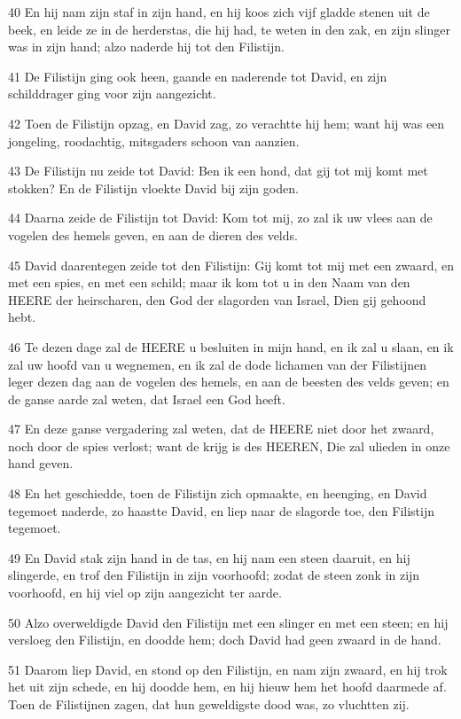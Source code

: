 \par 40 En hij nam zijn staf in zijn hand, en hij koos zich vijf gladde stenen uit de beek, en leide ze in de herderstas, die hij had, te weten in den zak, en zijn slinger was in zijn hand; alzo naderde hij tot den Filistijn.
\par 41 De Filistijn ging ook heen, gaande en naderende tot David, en zijn schilddrager ging voor zijn aangezicht.
\par 42 Toen de Filistijn opzag, en David zag, zo verachtte hij hem; want hij was een jongeling, roodachtig, mitsgaders schoon van aanzien.
\par 43 De Filistijn nu zeide tot David: Ben ik een hond, dat gij tot mij komt met stokken? En de Filistijn vloekte David bij zijn goden.
\par 44 Daarna zeide de Filistijn tot David: Kom tot mij, zo zal ik uw vlees aan de vogelen des hemels geven, en aan de dieren des velds.
\par 45 David daarentegen zeide tot den Filistijn: Gij komt tot mij met een zwaard, en met een spies, en met een schild; maar ik kom tot u in den Naam van den HEERE der heirscharen, den God der slagorden van Israel, Dien gij gehoond hebt.
\par 46 Te dezen dage zal de HEERE u besluiten in mijn hand, en ik zal u slaan, en ik zal uw hoofd van u wegnemen, en ik zal de dode lichamen van der Filistijnen leger dezen dag aan de vogelen des hemels, en aan de beesten des velds geven; en de ganse aarde zal weten, dat Israel een God heeft.
\par 47 En deze ganse vergadering zal weten, dat de HEERE niet door het zwaard, noch door de spies verlost; want de krijg is des HEEREN, Die zal ulieden in onze hand geven.
\par 48 En het geschiedde, toen de Filistijn zich opmaakte, en heenging, en David tegemoet naderde, zo haastte David, en liep naar de slagorde toe, den Filistijn tegemoet.
\par 49 En David stak zijn hand in de tas, en hij nam een steen daaruit, en hij slingerde, en trof den Filistijn in zijn voorhoofd; zodat de steen zonk in zijn voorhoofd, en hij viel op zijn aangezicht ter aarde.
\par 50 Alzo overweldigde David den Filistijn met een slinger en met een steen; en hij versloeg den Filistijn, en doodde hem; doch David had geen zwaard in de hand.
\par 51 Daarom liep David, en stond op den Filistijn, en nam zijn zwaard, en hij trok het uit zijn schede, en hij doodde hem, en hij hieuw hem het hoofd daarmede af. Toen de Filistijnen zagen, dat hun geweldigste dood was, zo vluchtten zij.
